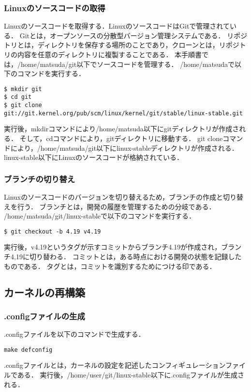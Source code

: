 \documentclass[12pt]{jsarticle}
\begin{document}
\subsubsection{Linuxのソースコードの取得}
Linuxのソースコードを取得する．LinuxのソースコードはGitで管理されている．
Gitとは，オープンソースの分散型バージョン管理システムである．
リポジトリとは，ディレクトリを保存する場所のことであり，クローンとは，リポジトリの内容を任意のディレクトリに複製することである．
本手順書では，/home/matsuda/git以下でソースコードを管理する．
/home/matsudaで以下のコマンドを実行する．
\begin{verbatim}
$ mkdir git
$ cd git
$ git clone git://git.kernel.org/pub/scm/linux/kernel/git/stable/linux-stable.git
\end{verbatim}
実行後，mkdirコマンドにより/home/matsuda以下にgitディレクトリが作成される．
そして，cdコマンドにより，gitディレクトリに移動する．
git cloneコマンドにより，/home/matsuda/git以下にlinux-stableディレクトリが作成される．
linux-stable以下にLinuxのソースコードが格納されている．

\subsubsection{ブランチの切り替え}
Linuxのソースコードのバージョンを切り替えるため，ブランチの作成と切り替えを行う．
ブランチとは，開発の履歴を管理するための分岐である．
/home/matsuda/git/linux-stableで以下のコマンドを実行する．
\begin{verbatim}
$ git checkout -b 4.19 v4.19
\end{verbatim}
実行後，v4.19というタグが示すコミットからブランチ4.19が作成され，ブランチ4,19に切り替わる．
コミットとは，ある時点における開発の状態を記録したものである．
タグとは，コミットを識別するためにつける印である．

\subsection{カーネルの再構築}
\subsubsection{.configファイルの生成}
.configファイルを以下のコマンドで生成する．
\begin{verbatim}
make defconfig
\end{verbatim}
.configファイルとは，カーネルの設定を記述したコンフィギュレーションファイルである．
実行後，/home/user/git/linux-stable以下に.configファイルが生成される．
\end{document}

